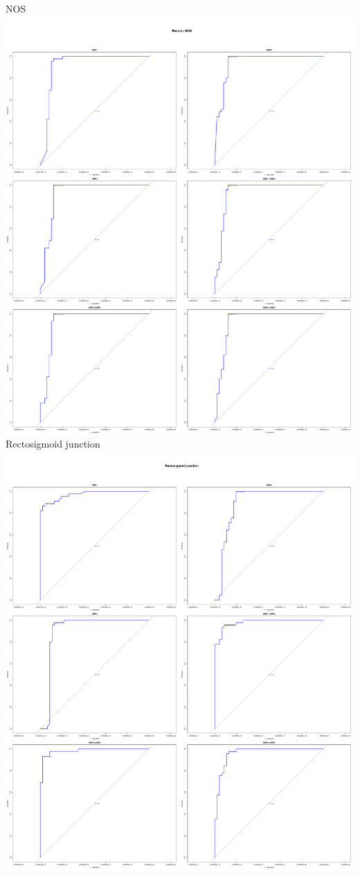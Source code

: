 \documentclass[openany]{book}
\begin{document}
NOS\includegraphics{book1_files/figure-latex/plots-5.pdf} Rectosigmoid
junction\includegraphics{book1_files/figure-latex/plots-6.pdf}
\end{document}
